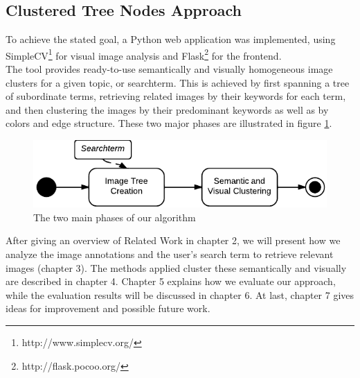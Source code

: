 \subsection{Clustered Tree Nodes Approach}
To achieve the stated goal, a Python web application was implemented, using SimpleCV\footnote{http://www.simplecv.org/} for visual image analysis and Flask\footnote{http://flask.pocoo.org/} for the frontend.\\
The tool provides ready-to-use semantically and visually homogeneous image clusters for a given topic, or searchterm. This is achieved by first spanning a tree of subordinate terms, retrieving related images by their keywords for each term, and then clustering the images by their predominant keywords as well as by colors and edge structure. These two major phases are illustrated in figure \ref{fig_overallprocess}.

\begin{figure}[h]
\centering
\includegraphics[]{images/search_process_highlevel.pdf}
\caption{The two main phases of our algorithm}
\label{fig_overallprocess}
\end{figure}

After giving an overview of Related Work in chapter 2, we will present how we analyze the image annotations and the user's search term to retrieve relevant images (chapter 3). The methods applied cluster these semantically and visually are described in chapter 4. Chapter 5 explains how we evaluate our approach, while the evaluation results will be discussed in chapter 6. At last, chapter 7 gives ideas for improvement and possible future work.
